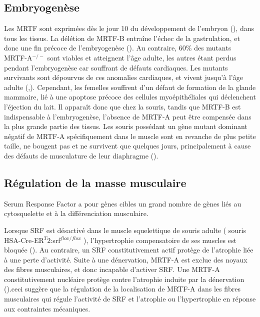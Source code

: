 \subsection{Embryogenèse}

Les MRTF sont exprimées dès le jour 10 du développement de l'embryon (\cite{wang_potentiation_2002}), dans tous les tissus. La délétion de MRTF-B entraîne l'échec de la gastrulation, et donc une fin précoce de l'embryogenèse (\cite{kalita_mkls:_2012}). Au contraire, 60\% des mutants MRTF-A$^{-/-}$ sont viables et atteignent l'âge adulte, les autres étant perdus pendant l'embryogenèse car souffrant de défauts cardiaques. Les mutants survivants sont dépourvus de ces anomalies cardiaques, et vivent jusqu'à l'âge adulte (\cite{li_requirement_2006},\cite{sun_acute_2006}). Cependant, les femelles souffrent d'un défaut de formation de la glande mammaire,  lié à une apoptose précoce des cellules myoépithéliales qui déclenchent l'éjection du lait. Il apparaît donc que chez la souris, tandis que MRTF-B est indispensable à l'embryogenèse, l'absence de MRTF-A peut être compensée dans la plus grande partie des tissus. 
Les souris possédant un gène mutant dominant négatif de MRTF-A spécifiquement dans le muscle sont en revanche de plus petite taille, ne bougent pas et ne survivent que quelques jours, principalement à cause des défauts de musculature de leur diaphragme (\cite{li_requirement_2005}). 

\subsection{Régulation de la masse musculaire}

Serum Response Factor a pour gènes cibles un grand nombre de gènes liés au cytosquelette et à la différenciation musculaire. 

Lorsque SRF est désactivé dans le muscle squelettique de souris adulte ( souris HSA-Cre-ER$^T2$:srf$^{flox/flox}$ ), l'hypertrophie compensatoire de ses muscles est bloquée (\cite{guerci_srf-dependent_2012}). Au contraire, un SRF constitutivement actif protège de l'atrophie liée à une perte d'activité. 
Suite à une dénervation, MRTF-A est exclue des noyaux des fibres musculaires, et donc incapable d'activer SRF. Une MRTF-A constitutivement nucléaire protège contre l'atrophie induite par la dénervation (\cite{collard_nuclear_2014}).ceci suggère que la régulation de la localisation de MRTF-A dans les fibres musculaires qui régule l'activité de SRF et l'atrophie ou l'hypertrophie en réponse aux contraintes mécaniques.  


